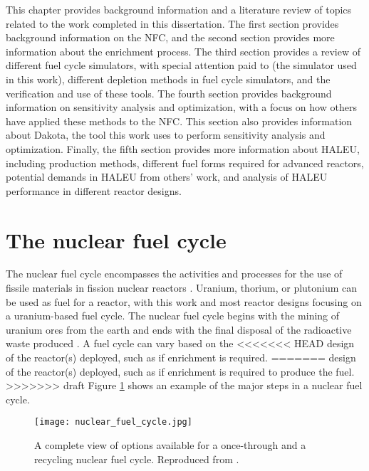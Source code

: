 This chapter provides background information and a literature 
review of topics related to the work completed in this 
dissertation. The first section provides background information 
on the \acrfull{NFC}, and the second section provides more 
information about the 
enrichment process. The third section provides a 
review of different fuel cycle simulators, with special 
attention paid to \Cyclus (the simulator used in this work), 
different depletion methods in 
fuel cycle simulators, and the verification and use of 
these tools. The fourth section provides background information 
on sensitivity analysis and optimization, with a focus on 
how others have applied these methods to the \gls{NFC}. 
This section also provides information about Dakota, 
the tool this work uses to perform sensitivity analysis 
and optimization. Finally, the fifth section provides more 
information about \gls{HALEU}, including production methods, 
different fuel forms required for advanced reactors, potential 
demands in \gls{HALEU} from others' work, and analysis of 
\gls{HALEU} performance in different reactor designs. 
%
%
%
\section{The nuclear fuel cycle}
The nuclear fuel cycle encompasses the activities and processes 
for the use of fissile materials in fission nuclear reactors 
\cite{tsoulfanidis_nuclear_2013}. 
Uranium, thorium, or plutonium can be used as 
fuel for a reactor, with this work and most reactor designs focusing on 
a uranium-based 
fuel cycle. The nuclear fuel cycle begins with the mining of uranium ores 
from the earth and ends with the final disposal of the radioactive 
waste produced 
\cite{tsoulfanidis_nuclear_2013}. A fuel cycle can vary based on the
<<<<<<< HEAD
design of the reactor(s) deployed, such as if enrichment is required.  
=======
design of the reactor(s) deployed, such as if enrichment is required 
to produce the fuel.  
>>>>>>> draft
Figure \ref{fig:fuel_cycle} shows 
an example of the major steps in a nuclear fuel cycle. 

\begin{figure}
    \centering
    \texttt{[image: nuclear\_fuel\_cycle.jpg]}
    \caption{A complete view of options available for a once-through and 
    a recycling nuclear fuel cycle. Reproduced from 
    \protect\cite{us_nuclear_regulatory_commission_stages_2020}.}
    \label{fig:fuel_cycle}
\end{figure}

